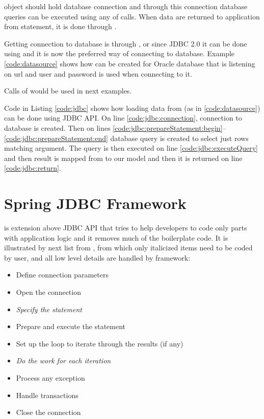  object should hold database connection and through this connection
database queries can be executed using any of  calls.
When data are returned to application from statement, it is done through .

Getting connection to database is through , or since JDBC 2.0
it can be done using  and it is now the preferred way of connecting to database.
Example \ref{code:datasource} shows how  can be created for Oracle database
that is listening on url 
and  user and  password is used when connecting to it.

Calls of  would be used in next examples.


Code in Listing \ref{code:jdbc} shows how loading data from 
(as in \ref{code:datasource}) can be done using JDBC API.
On line \ref{code:jdbc:connection}, connection to database is created.
Then on lines \ref{code:jdbc:prepareStatement:begin}--\ref{code:jdbc:prepareStatement:end}
database query is created to select just rows matching  argument.
The query is then executed on line \ref{code:jdbc:executeQuery} and then
result is mapped from  to our  model and then it is returned on line \ref{code:jdbc:return}.





\section{Spring JDBC Framework \label{frameworks:jdbcTemplate}}
\citet{SpringJDBC} is extension above JDBC API that tries to help developers to code only
parts with application logic and it removes much of the boilerplate code.
It is illustrated by next list from \citet{SpringJDBC}, from which only
italicized items need to be coded by user, and all low level details
are handled by framework:
\begin{itemize}
  \item Define connection parameters
  \item Open the connection
  \item \textit{Specify the statement}
  \item Prepare and execute the statement
  \item Set up the loop to iterate through the results (if any)
  \item \textit{Do the work for each iteration}
  \item Process any exception
  \item Handle transactions
  \item Close the connection   
\end{itemize}

